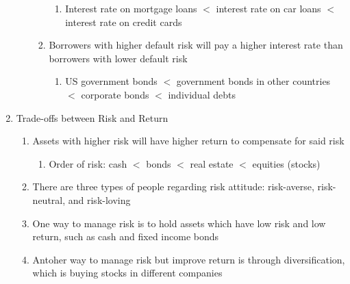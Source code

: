 \documentclass[12pt]{article}
\begin{document}
\begin{enumerate}
\begin{enumerate}
\begin{enumerate}
\begin{enumerate}
                  \item Interest rate on mortgage loans $<$ interest rate on car loans $<$ interest rate on credit cards

                \end{enumerate}

              \item Borrowers with higher default risk will pay a higher interest rate than borrowers with lower default risk

                \begin{enumerate}

                  \item US government bonds $<$ government bonds in other countries $<$ corporate bonds $<$ individual debts

                \end{enumerate}

            \end{enumerate}

        \end{enumerate}

      \item Trade-offs between Risk and Return

        \begin{enumerate}
            
          \item Assets with higher risk will have higher return to compensate for said risk

            \begin{enumerate}

              \item Order of risk: cash $<$ bonds $<$ real estate $<$ equities (stocks)

            \end{enumerate}

          \item There are three types of people regarding risk attitude: risk-averse, risk-neutral, and risk-loving

          \item One way to manage risk is to hold assets which have low risk and low return, such as cash and fixed income bonds

          \item Antoher way to manage risk but improve return is through diversification, which is buying stocks in different companies


\end{enumerate}
\end{enumerate}
\end{document}
